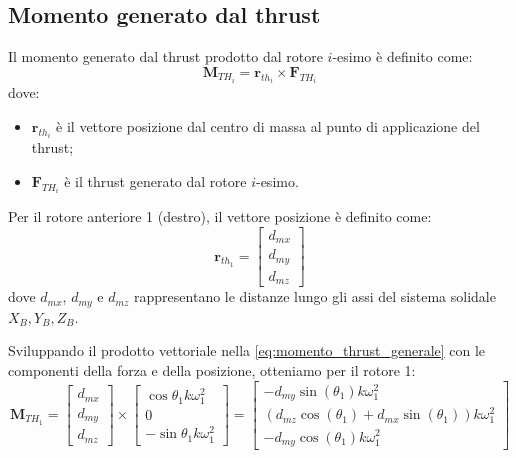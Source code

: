 \subsection{Momento generato dal thrust}
Il momento generato dal thrust prodotto dal rotore $i$-esimo è definito come:
\begin{equation}
    \bm{M}_{TH_{i}} = \bm{r}_{th_{i}} \times \bm{F}_{TH_{i}} \label{eq:momento_thrust_generale}
\end{equation}
dove:
\begin{itemize}
    \item $\bm{r}_{th_{i}}$ è il vettore posizione dal centro di massa al punto di applicazione del thrust;
    \item $\bm{F}_{TH_{i}}$ è il thrust generato dal rotore $i$-esimo.
\end{itemize}

Per il rotore anteriore 1 (destro), il vettore posizione è definito come:
\begin{equation}
    \bm{r}_{th_1} = \begin{bmatrix} d_{mx} \\ d_{my} \\ d_{mz} \end{bmatrix} \label{eq:pos_r1}
\end{equation}
dove $d_{mx}$, $d_{my}$ e $d_{mz}$ rappresentano le distanze lungo gli assi del sistema solidale $X_B, Y_B, Z_B$.


Sviluppando il prodotto vettoriale nella \ref{eq:momento_thrust_generale} con le componenti della forza e della posizione, otteniamo per il rotore 1:
\begin{equation}
    \bm{M}_{TH_{1}} = \begin{bmatrix} d_{mx} \\ d_{my} \\ d_{mz} \end{bmatrix} 
    \times \begin{bmatrix} \cos\theta_1 k\omega_{1}^2 \\ 0 \\ -\sin\theta_1 k\omega_{1}^2 \end{bmatrix} = 
    \begin{bmatrix} 
        -d_{my} \sin(\theta_{1}) k\omega_{1}^2 \\ 
        (d_{mz} \cos(\theta_{1}) + d_{mx} \sin(\theta_{1})) k\omega_{1}^2 \\ 
        -d_{my} \cos(\theta_{1}) k\omega_{1}^2 
    \end{bmatrix} \label{eq:M_TH1}
\end{equation}

